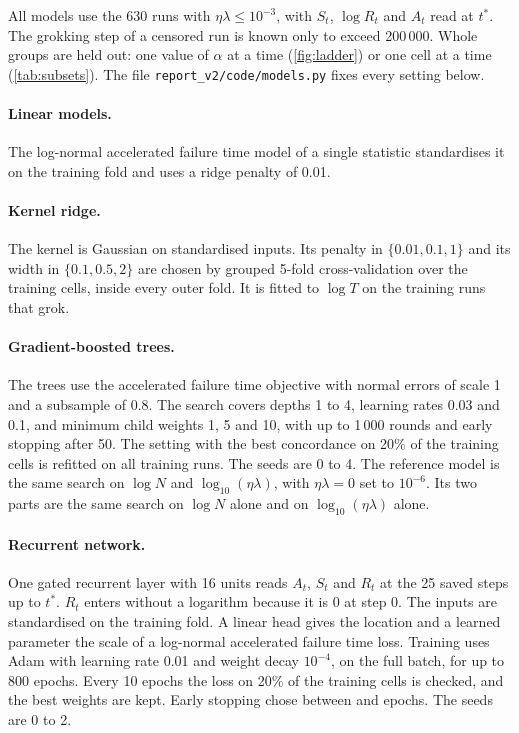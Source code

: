 \documentclass[a4paper,11pt]{article} %
\newcommand{\file}[1]{\nolinkurl{#1}}
\newcommand{\tstar}{t^{\ast}}
\begin{document}
All models use the 630 runs with $\eta\lambda\le10^{-3}$, with $S_t$,
$\log R_t$ and $A_t$ read at $\tstar$. The grokking step of a censored run is
known only to exceed 200\,000. Whole groups are held out: one value of $\alpha$
at a time (\cref{fig:ladder}) or one cell at a time (\cref{tab:subsets}). The
file \file{report_v2/code/models.py} fixes every setting below.

\paragraph{Linear models.} The log-normal accelerated failure time model of a
single statistic standardises it on the training fold and uses a ridge penalty
of 0.01.

\paragraph{Kernel ridge.} The kernel is Gaussian on standardised inputs. Its
penalty in $\{0.01,0.1,1\}$ and its width in $\{0.1,0.5,2\}$ are
chosen by grouped
5-fold cross-validation over the training cells, inside every outer fold. It is
fitted to $\log T$ on the training runs that grok.

\paragraph{Gradient-boosted trees.} The trees use the accelerated failure time
objective with normal errors of scale 1 and a subsample of 0.8. The
search covers
depths 1 to 4, learning rates 0.03 and 0.1, and minimum child weights
1, 5 and 10,
with up to 1\,000 rounds and early stopping after 50. The setting with the best
concordance on 20\% of the training cells is refitted on all training runs. The
seeds are 0 to 4. The reference model is the same search on $\log N$ and
$\log_{10}(\eta\lambda)$, with $\eta\lambda=0$ set to $10^{-6}$. Its
two parts are
the same search on $\log N$ alone and on $\log_{10}(\eta\lambda)$ alone.

\paragraph{Recurrent network.} One gated recurrent layer with 16 units reads
$A_t$, $S_t$ and $R_t$ at the 25 saved steps up to $\tstar$. $R_t$ enters
without a logarithm because it is 0 at step 0. The inputs are standardised on
the training fold. A linear head gives the location and a learned parameter the
scale of a log-normal accelerated failure time loss. Training uses Adam with
learning rate 0.01 and weight decay $10^{-4}$, on the full batch, for up to 800
epochs. Every 10 epochs the loss on 20\% of the training cells is
checked, and the
best weights are kept. Early stopping chose between \EfifteenGruEpochsMin{} and
\EfifteenGruEpochsMax{} epochs. The seeds are 0 to 2.
\end{document}
